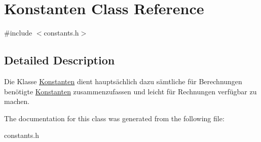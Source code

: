 \hypertarget{classKonstanten}{\section{Konstanten Class Reference}
\label{classKonstanten}
}


{\ttfamily \#include $<$constants.\-h$>$}



\subsection{Detailed Description}
Die Klasse \hyperlink{classKonstanten}{Konstanten} dient hauptsächlich dazu sämtliche für Berechnungen benötigte \hyperlink{classKonstanten}{Konstanten} zusammenzufassen und leicht für Rechnungen verfügbar zu machen. 

The documentation for this class was generated from the following file\-:\begin{DoxyCompactItemize}
\item 
constants.\-h\end{DoxyCompactItemize}
